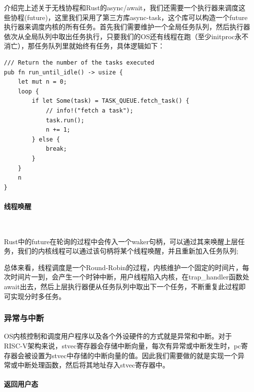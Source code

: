 介绍完上述关于无栈协程和Rust的async/await，我们还需要一个执行器来调度这些协程(future)，这里我们采用了第三方库async-task，这个库可以构造一个future执行器来调度内核的所有任务。首先我们需要维护一个全局任务队列，然后执行器依次从全局队列中取出任务执行，只要我们的OS还有线程在跑（至少initproc永不消亡），那任务队列里就始终有任务，具体逻辑如下：
\begin{tcolorbox}[
title=\textbf{os/src/executor/mod.rs},
listing only,
breakable
]
    \begin{verbatim}
/// Return the number of the tasks executed
pub fn run_until_idle() -> usize {
    let mut n = 0;
    loop {
        if let Some(task) = TASK_QUEUE.fetch_task() {
            // info!("fetch a task");
            task.run();
            n += 1;
        } else {
            break;
        }
    }
    n
}
    \end{verbatim}
\end{tcolorbox}

\paragraph{线程唤醒}~{}

Rust中的future在轮询的过程中会传入一个waker句柄，可以通过其来唤醒上层任务，我们的内核线程可以通过该句柄将某个线程唤醒，并且重新加入任务队列;

总体来看，线程调度是一个Round-Robin的过程，内核维护一个固定的时间片，每次时间片一到，会产生一个时钟中断，用户线程陷入内核，在trap\_handler函数处await出去，然后上层执行器便从任务队列中取出下一个任务，不断重复此过程即可实现分时多任务。

\subsubsection{异常与中断}
OS内核控制和调度用户程序以及各个外设硬件的方式就是异常和中断。对于RISC-V架构来说，stvec寄存器会存储中断向量，每次有异常或中断发生时，pc寄存器会被设置为stvec中存储的中断向量的值。因此我们需要做的就是实现一个异常或中断处理函数，然后将其地址存入stvec寄存器中。

\paragraph{返回用户态}~{}

